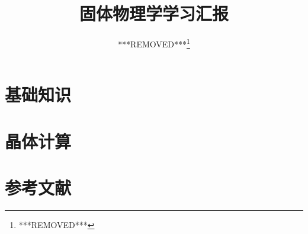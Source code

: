 \documentclass{ctexart}
\title{固体物理学学习汇报}
\author{***REMOVED***\thanks{***REMOVED***}}
\numberwithin{equation}{subsection}
\theoremstyle{definition}
\begin{document}
\maketitle
\tableofcontents
\clearpage

\section{基础知识}


\section{晶体计算}


\section{参考文献}
\nocite{*}
\printbibliography[heading=none]
\end{document}
